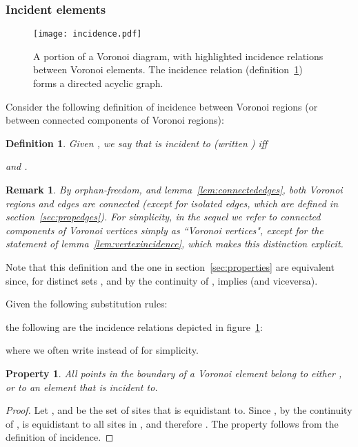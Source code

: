 \documentclass[11pt]{article}
\newtheorem{definition}{Definition}
\newtheorem{remark}{Remark}
\newtheorem{property}{Property}
\begin{document}
\subsubsection{Incident elements}\label{sec:incidence}


\begin{figure}[htbp]
   \centering
\texttt{[image: incidence.pdf]}
\caption{A portion of a Voronoi diagram, with highlighted incidence relations between Voronoi elements. 
   		The incidence relation (definition~\ref{def:incidence}) forms a directed acyclic graph. }
   \label{fig:incidence}
\end{figure}

Consider the following definition of incidence between Voronoi regions (or between connected components of Voronoi regions):

\begin{definition}\label{def:incidence}
Given , we say that  is incident to  (written ) iff 
 
	\emph{and} . 
\end{definition}



\begin{remark}
By orphan-freedom, and lemma~\ref{lem:connectededges}, both Voronoi regions and edges are connected
	(except for isolated edges, which are defined in section~\ref{sec:propedges}).
For simplicity, in the sequel we refer to connected components of Voronoi vertices simply as ``Voronoi vertices",
	except for the statement of lemma~\ref{lem:vertexincidence}, which makes this distinction explicit. 
\end{remark}


Note that this definition and the one in section~\ref{sec:properties} are equivalent since, 
	for distinct sets , and 	by the continuity of , 
	 implies 
	(and viceversa). 







Given the following substitution rules:

the following are the incidence relations depicted in figure~\ref{fig:incidence}: 

where we often write  instead of  for simplicity. 




\begin{property}\label{prop:boundaryincidence}
	All points in the boundary of a Voronoi element  belong to either , 
		or to an element that  is incident to. \end{property}
\begin{proof}
	Let , and  be the set of sites that  is equidistant to. 
	Since , by the continuity of ,  is equidistant to all sites in , 
		and therefore . 
	The property follows from the definition of incidence. 
\end{proof}
\end{document}
